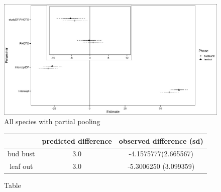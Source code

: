 \documentclass[12pt]{article}\usepackage[]{graphicx}\usepackage[]{color}
\begin{document}
\begin{figure}[h!]
    \centering
 \includegraphics[width=\textwidth]{..//Plots/periodicity_figures/photothermo_allsps.jpeg}
    \caption{All species with partial pooling}
    \label{fig:Figure 3}
\end{figure}


\begin{figure}[h!]
    \centering
\begin{tabular}{|c|c|c|}
\hline
& predicted difference & observed difference (sd)\\
\hline
bud bust& 3.0 & -4.1575777(2.665567)\\
leaf out&3.0 & -5.3006250 (3.099359)\\
\hline
\end{tabular}
    \caption{Table}
    \label{fig:Figure 4}
\end{figure}
\end{document}
